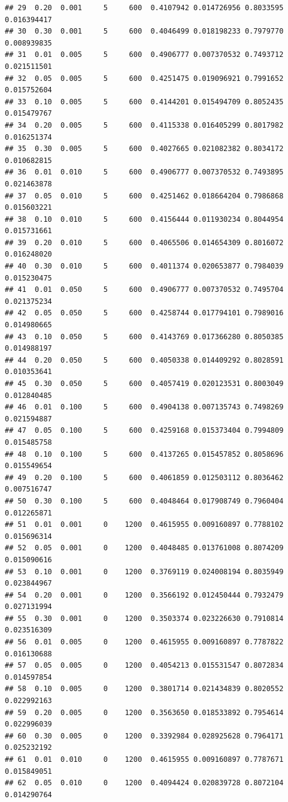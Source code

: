 \documentclass[
]{article}
\begin{document}
\begin{verbatim}
## 29  0.20  0.001     5     600  0.4107942 0.014726956 0.8033595 0.016394417
## 30  0.30  0.001     5     600  0.4046499 0.018198233 0.7979770 0.008939835
## 31  0.01  0.005     5     600  0.4906777 0.007370532 0.7493712 0.021511501
## 32  0.05  0.005     5     600  0.4251475 0.019096921 0.7991652 0.015752604
## 33  0.10  0.005     5     600  0.4144201 0.015494709 0.8052435 0.015479767
## 34  0.20  0.005     5     600  0.4115338 0.016405299 0.8017982 0.016251374
## 35  0.30  0.005     5     600  0.4027665 0.021082382 0.8034172 0.010682815
## 36  0.01  0.010     5     600  0.4906777 0.007370532 0.7493895 0.021463878
## 37  0.05  0.010     5     600  0.4251462 0.018664204 0.7986868 0.015603221
## 38  0.10  0.010     5     600  0.4156444 0.011930234 0.8044954 0.015731661
## 39  0.20  0.010     5     600  0.4065506 0.014654309 0.8016072 0.016248020
## 40  0.30  0.010     5     600  0.4011374 0.020653877 0.7984039 0.015230475
## 41  0.01  0.050     5     600  0.4906777 0.007370532 0.7495704 0.021375234
## 42  0.05  0.050     5     600  0.4258744 0.017794101 0.7989016 0.014980665
## 43  0.10  0.050     5     600  0.4143769 0.017366280 0.8050385 0.014988197
## 44  0.20  0.050     5     600  0.4050338 0.014409292 0.8028591 0.010353641
## 45  0.30  0.050     5     600  0.4057419 0.020123531 0.8003049 0.012840485
## 46  0.01  0.100     5     600  0.4904138 0.007135743 0.7498269 0.021594887
## 47  0.05  0.100     5     600  0.4259168 0.015373404 0.7994809 0.015485758
## 48  0.10  0.100     5     600  0.4137265 0.015457852 0.8058696 0.015549654
## 49  0.20  0.100     5     600  0.4061859 0.012503112 0.8036462 0.007516747
## 50  0.30  0.100     5     600  0.4048464 0.017908749 0.7960404 0.012265871
## 51  0.01  0.001     0    1200  0.4615955 0.009160897 0.7788102 0.015696314
## 52  0.05  0.001     0    1200  0.4048485 0.013761008 0.8074209 0.015090616
## 53  0.10  0.001     0    1200  0.3769119 0.024008194 0.8035949 0.023844967
## 54  0.20  0.001     0    1200  0.3566192 0.012450444 0.7932479 0.027131994
## 55  0.30  0.001     0    1200  0.3503374 0.023226630 0.7910814 0.023516309
## 56  0.01  0.005     0    1200  0.4615955 0.009160897 0.7787822 0.016130688
## 57  0.05  0.005     0    1200  0.4054213 0.015531547 0.8072834 0.014597854
## 58  0.10  0.005     0    1200  0.3801714 0.021434839 0.8020552 0.022992163
## 59  0.20  0.005     0    1200  0.3563650 0.018533892 0.7954614 0.022996039
## 60  0.30  0.005     0    1200  0.3392984 0.028925628 0.7964171 0.025232192
## 61  0.01  0.010     0    1200  0.4615955 0.009160897 0.7787671 0.015849051
## 62  0.05  0.010     0    1200  0.4094424 0.020839728 0.8072104 0.014290764

\end{verbatim}
\end{document}
